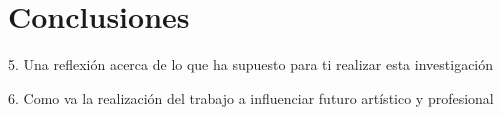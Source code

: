 \chapter[Conclusiones]{Conclusiones}

5. Una reflexión acerca de lo que ha supuesto para ti realizar esta investigación

6. Como va la realización del trabajo a influenciar futuro artístico y profesional 